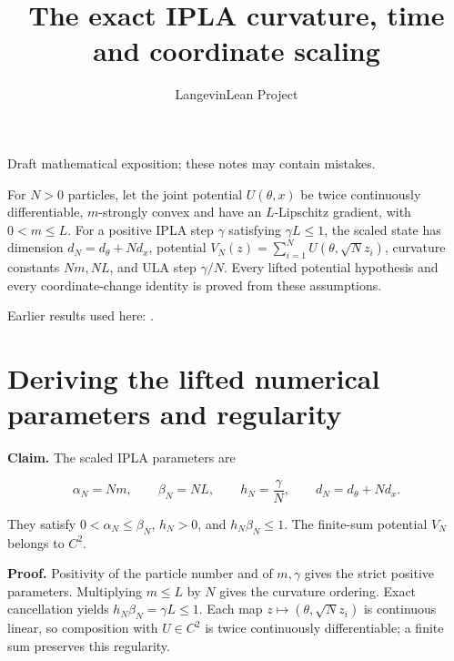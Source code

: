 \documentclass[11pt,a4paper]{article}
\title{\texorpdfstring{The exact IPLA curvature, time and coordinate scaling}{The exact IPLA curvature, time and coordinate scaling}}
\author{LangevinLean Project}
\date{}
\begin{document}
\maketitle
Draft mathematical exposition; these notes may contain mistakes.


For \(N>0\) particles, let the joint potential \(U(\theta,x)\) be twice continuously differentiable, \(m\)-strongly convex and have an \(L\)-Lipschitz gradient, with \(0<m\le L\). For a positive IPLA step \(\gamma\) satisfying \(\gamma L\le1\), the scaled state has dimension \(d_N=d_\theta+Nd_x\), potential \(V_N(z)=\sum_{i=1}^NU(\theta,\sqrt N z_i)\), curvature constants \(Nm,NL\), and ULA step \(\gamma/N\). Every lifted potential hypothesis and every coordinate-change identity is proved from these assumptions.



Earlier results used here: \cite[Section~3.1]{LangevinLean2026IPLA}.

\section{\texorpdfstring{Deriving the lifted numerical parameters and regularity}{Deriving the lifted numerical parameters and regularity}}


\textbf{Claim.} The scaled IPLA parameters are

\[\alpha_N=Nm,\qquad\beta_N=NL,\qquad h_N=\frac{\gamma}{N},\qquad d_N=d_\theta+Nd_x.\]


They satisfy \(0<\alpha_N\le\beta_N\), \(h_N>0\), and \(h_N\beta_N\le1\). The finite-sum potential \(V_N\) belongs to \(C^2\).




\textbf{Proof.} Positivity of the particle number and of \(m,\gamma\) gives the strict positive parameters. Multiplying \(m\le L\) by \(N\) gives the curvature ordering. Exact cancellation yields \(h_N\beta_N=\gamma L\le1\). Each map \(z\mapsto(\theta,\sqrt N z_i)\) is continuous linear, so composition with \(U\in C^2\) is twice continuously differentiable; a finite sum preserves this regularity.
\end{document}
